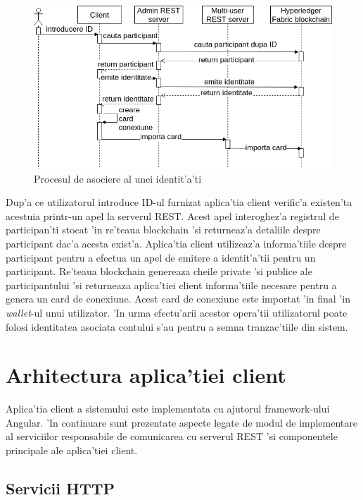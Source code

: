 \documentclass[12pt,a4paper,twoside]{report}
\begin{document}
  	 \begin{figure}[H]
		\begin{center}
			\includegraphics[scale=0.55]{img/seq-usr-cr.png}
			\caption{Procesul de asociere al unei identit'a'ti}
  			\label{fig:assoc}
  		\end{center}
  		\end{figure}
  	
  	Dup'a ce utilizatorul introduce ID-ul furnizat aplica'tia client verific'a existen'ta acestuia printr-un apel la serverul REST. Acest apel interoghez'a registrul de participan'ti stocat 'in re'teaua blockchain 'si returneaz'a detaliile despre participant dac'a acesta exist'a. Aplica'tia client utilizeaz'a informa'tiile despre participant pentru a efectua un apel de emitere a identit'a'tii pentru un participant. Re'teaua blockchain genereaza cheile private 'si publice ale participantului 'si returneaza aplica'tiei client informa'tiile necesare pentru a genera un card de conexiune. Acest card de conexiune este importat 'in final 'in \emph{wallet}-ul unui utilizator. 'In urma efectu'arii acestor opera'tii utilizatorul poate folosi identitatea asociata contului s'au pentru a semna tranzac'tiile din sistem.	
  	
  	\section{Arhitectura aplica'tiei client}
  	
  	Aplica'tia client a sistemului este implementata cu ajutorul framework-ului Angular. 'In continuare sunt prezentate aspecte legate de modul de implementare al serviciilor responsabile de comunicarea cu serverul REST 'si componentele principale ale aplica'tiei client.
  	
  	\subsection{Servicii HTTP}
  	
\end{document}
